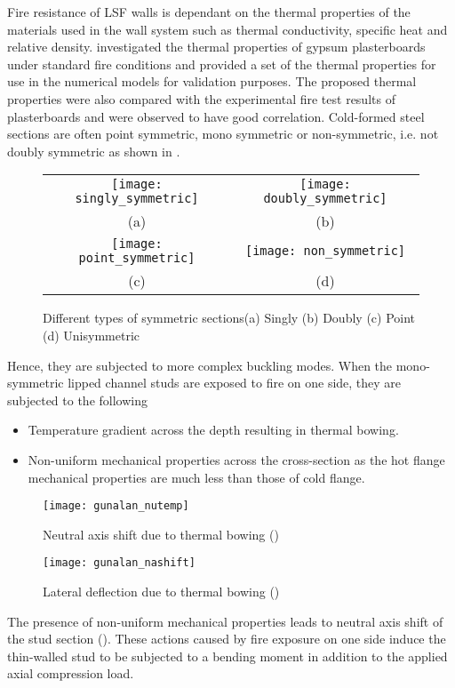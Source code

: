 Fire resistance of LSF walls is dependant on the thermal properties of the materials used in the wall system such as thermal conductivity, specific heat and relative density. \citet{Keerthan2012} investigated the thermal properties of gypsum plasterboards under standard fire conditions and provided a set of the thermal properties for use in the numerical models for validation purposes. The proposed thermal properties were also compared with the experimental fire test results of plasterboards and were observed to have good correlation. Cold-formed steel sections are often point symmetric, mono symmetric or non-symmetric, i.e. not doubly symmetric as shown in . 
\begin{figure}[!htbp]
	\centering
		\begin{tabular}{cc}
			\texttt{[image: singly\_symmetric]} & \texttt{[image: doubly\_symmetric]} \\ 
			(a) & (b)  \\ 
			\texttt{[image: point\_symmetric]} & \texttt{[image: non\_symmetric]} \\ 
			(c) & (d)  \\
		\end{tabular} 
		\caption{Different types of symmetric sections(a) Singly (b) Doubly (c) Point (d) Unisymmetric}
		\label{fig:symmetry}
\end{figure}
Hence, they are subjected to more complex buckling modes. When the mono-symmetric lipped channel studs are exposed to fire on one side, they are subjected to the following
\begin{itemize}
	\item Temperature gradient across the depth resulting in thermal bowing.
	\item Non-uniform mechanical properties across the cross-section as the hot flange mechanical properties are much less than those of cold flange.
\end{itemize}
\begin{figure}[htbp]
	\centering	
		\texttt{[image: gunalan\_nutemp]}
		\caption{Neutral axis shift due to thermal bowing (\cite{Gunalan2014j})}
		\label{fig:gunalan_nutemp}
\end{figure}
\begin{figure}[htbp]
	\centering	
		\texttt{[image: gunalan\_nashift]}
		\caption{Lateral deflection due to thermal bowing (\cite{Gunalan2014j})}
		\label{fig:gunalan_nashift}
\end{figure}
The presence of non-uniform mechanical properties leads to neutral axis shift of the stud section (). These actions caused by fire exposure on one side induce the thin-walled stud to be subjected to a bending moment in addition to the applied axial compression load.


